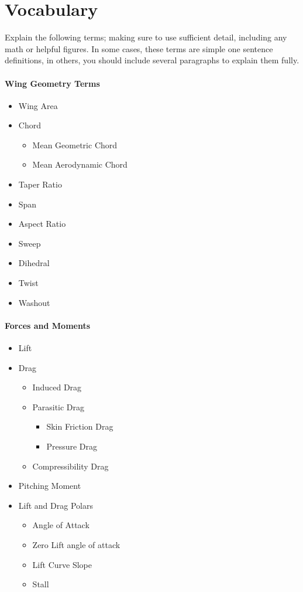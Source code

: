 \documentclass[11pt,twocolumn]{article}
\begin{document}
\section{Vocabulary}
\label{sec:vocab}

Explain the following terms; making sure to use sufficient detail, including any math or helpful figures.
In some cases, these terms are simple one sentence definitions, in others, you should include several paragraphs to explain them fully.

\paragraph{Wing Geometry Terms}
\begin{itemize}
	\item Wing Area
	\item Chord
	\begin{itemize}
		\item Mean Geometric Chord
		\item Mean Aerodynamic Chord
	\end{itemize}
	\item Taper Ratio
	\item Span
	\item Aspect Ratio
	\item Sweep
	\item Dihedral
	\item Twist
	\item Washout
\end{itemize}

\paragraph{Forces and Moments}
\begin{itemize}
	\item Lift
	\item Drag
		\begin{itemize}
			\item Induced Drag
			\item Parasitic Drag
				\begin{itemize}
					\item Skin Friction Drag
					\item Pressure Drag
				\end{itemize}
			\item Compressibility Drag
		\end{itemize}
	\item Pitching Moment
	\item Lift and Drag Polars
	\begin{itemize}
		\item Angle of Attack
		\item Zero Lift angle of attack
		\item Lift Curve Slope
		\item Stall
	\end{itemize}
\end{itemize}
\end{document}
